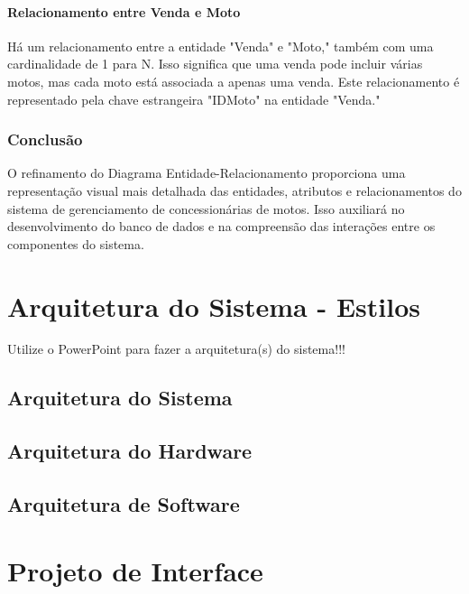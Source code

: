 \paragraph{Relacionamento entre Venda e Moto}

Há um relacionamento entre a entidade "Venda" e "Moto," também com uma cardinalidade de 1 para N. Isso significa que uma venda pode incluir várias motos, mas cada moto está associada a apenas uma venda. Este relacionamento é representado pela chave estrangeira "IDMoto" na entidade "Venda."

\subsubsection{Conclusão}

O refinamento do Diagrama Entidade-Relacionamento proporciona uma representação visual mais detalhada das entidades, atributos e relacionamentos do sistema de gerenciamento de concessionárias de motos. Isso auxiliará no desenvolvimento do banco de dados e na compreensão das interações entre os componentes do sistema.







\section{Arquitetura do Sistema - Estilos}

    Utilize o PowerPoint para fazer a arquitetura(s) do sistema!!!

    \subsection{Arquitetura do Sistema}



    \subsection{Arquitetura do Hardware}


    \subsection{Arquitetura de Software}


\section{Projeto de Interface}


